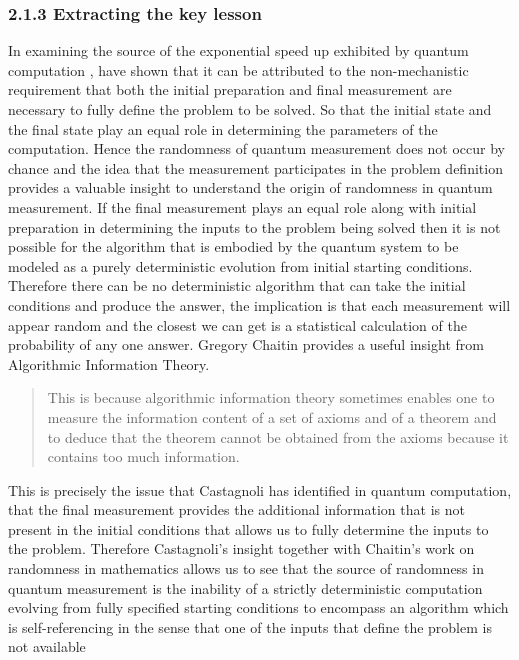 \documentclass[
   ,final            %
  ]
  {aipproc}
\begin{document}
\subsubsection{2.1.3 Extracting the key lesson}
In examining the source of the exponential speed up exhibited by quantum computation \citet{Castagnoli_finkelstein_2001,cast_and_monti_2000} , have %
shown that it can be attributed to the non-mechanistic requirement that both the initial
preparation and final measurement are necessary to fully define the problem to be solved. So that the
initial state and the final state play an equal role in determining the parameters of the computation.
Hence the randomness of quantum measurement does not occur by chance and the idea that the measurement 
participates in the problem definition provides a valuable insight to understand the origin of randomness
in quantum measurement. If the final measurement plays an equal role along with initial preparation in
determining the inputs to the problem being solved then it is not possible for the algorithm that is embodied
by the quantum system to be modeled as a purely deterministic evolution from initial starting conditions.
Therefore there can be no deterministic algorithm that can take the initial conditions and produce the
answer, the implication is that each measurement will appear random
and the closest we can get is a statistical calculation of the probability of any one answer. Gregory Chaitin
\cite{Chaitin_limits_book} provides a useful insight from Algorithmic Information Theory.
\begin{quotation}
This is because algorithmic information theory sometimes enables one to measure the information
content of a set of axioms and of a theorem and to deduce that the theorem cannot be obtained
from the axioms because it contains too much information.
\end{quotation}
\par
This is precisely the issue that Castagnoli has identified in quantum computation, that the final measurement
provides the additional information that is not present in the initial conditions that allows us
to fully determine the inputs to the problem. Therefore Castagnoli's insight together with Chaitin's work
on randomness in mathematics allows us to see that the source of randomness in quantum measurement
is the inability of a strictly deterministic computation evolving from fully specified starting conditions to
encompass an algorithm which is self-referencing in the sense that one of the inputs that define the problem is not available
\end{document}
